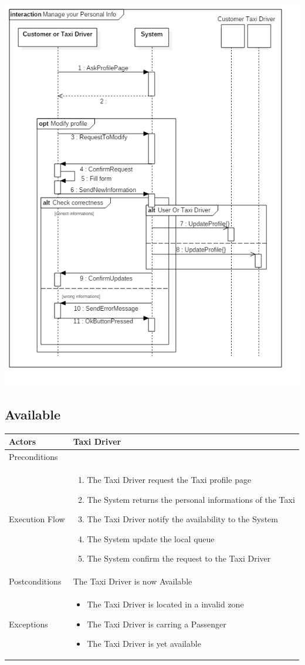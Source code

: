 \documentclass[english]{article}
\begin{document}
\includegraphics[width=\textwidth]{ManageInformation}

\subsection{Available}

\begin{tabular}{lp{8cm}}
\hline
Actors & Taxi Driver \\
\hline
Preconditions & \\
\hline
Execution Flow &  
		\begin{enumerate}
			\item The Taxi Driver request the Taxi profile page
			\item The System returns the personal informations of the Taxi
			\item The Taxi Driver notify the availability to the System
			\item The System update the local queue
			\item The System confirm the request to the Taxi Driver
		\end{enumerate} 
	\\ 
\hline
Postconditions & The Taxi Driver is now Available \\
\hline
Exceptions & 
	\begin{itemize} 
		\item The Taxi Driver is located in a invalid zone
		\item The Taxi Driver is carring a Passenger
		\item The Taxi Driver is yet available
	\end{itemize}
\end{tabular}
\end{document}
